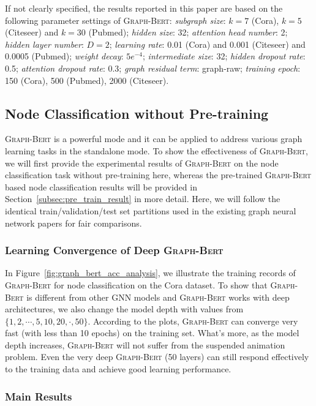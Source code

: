 \documentclass{article}
\newcommand{\our}{\textsc{Graph-Bert}}
\begin{document}
If not clearly specified, the results reported in this paper are based on the following parameter settings of {\our}: \textit{subgraph size}: $k=7$ (Cora), $k=5$ (Citeseer) and $k=30$ (Pubmed); \textit{hidden size}: 32; \textit{attention head number}: 2; \textit{hidden layer number}: $D=2$; \textit{learning rate}: 0.01 (Cora) and 0.001 (Citeseer) and 0.0005 (Pubmed); \textit{weight decay}: $5e^{-4}$; \textit{intermediate size}: 32; \textit{hidden dropout rate}: 0.5; \textit{attention dropout rate}: 0.3; \textit{graph residual term}: graph-raw; \textit{training epoch}: 150 (Cora), 500 (Pubmed), 2000 (Citeseer).

\subsection{Node Classification without Pre-training}

{\our} is a powerful mode and it can be applied to address various graph learning tasks in the standalone mode. To show the effectiveness of {\our}, we will first provide the experimental results of {\our} on the node classification task without pre-training here, whereas the pre-trained {\our} based node classification results will be provided in Section~\ref{subsec:pre_train_result} in more detail. Here, we will follow the identical train/validation/test set partitions used in the existing graph neural network papers \cite{YCS16} for fair comparisons.

\subsubsection{Learning Convergence of Deep {\our}}

In Figure~\ref{fig:graph_bert_acc_analysis}, we illustrate the training records of {\our} for node classification on the Cora dataset. To show that {\our} is different from other GNN models and {\our} works with deep architectures, we also change the model depth with values from $\{1, 2, \cdots, 5, 10, 20, \cdot, 50\}$. According to the plots, {\our} can converge very fast (with less than 10 epochs) on the training set. What's more, as the model depth increases, {\our} will not suffer from the suspended animation problem. Even the very deep {\our} (50 layers) can still respond effectively to the training data and achieve good learning performance.



\subsubsection{Main Results}
\end{document}
